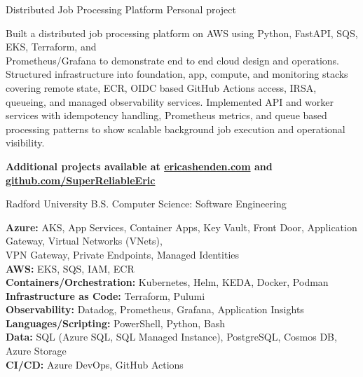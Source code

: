 \documentclass[a4paper]{ReadableCV}
\begin{document}
\medskip

{Distributed Job Processing Platform}
{Personal project}

\roleAchievements
{Built a distributed job processing platform on AWS using Python, FastAPI, SQS, EKS, Terraform, and\\ Prometheus/Grafana to demonstrate end to end cloud design and operations.}
{Structured infrastructure into foundation, app, compute, and monitoring stacks covering remote state, ECR, OIDC based GitHub Actions access, IRSA, queueing, and managed observability services.}
{Implemented API and worker services with idempotency handling, Prometheus metrics, and queue based processing patterns to show scalable background job execution and operational visibility.}
{}{}{}{}{}{}

\medskip
\begin{center}
\textbf{Additional projects available at \href{https://ericashenden.com}{ericashenden.com} and \href{https://github.com/SuperReliableEric}{github.com/SuperReliableEric}}
\end{center}
\medskip


{Radford University}
{B.S. Computer Science: Software Engineering}{}


{\small
\noindent\textbf{Azure:} AKS, App Services, Container Apps, Key Vault, Front Door, Application Gateway, Virtual Networks (VNets),\\
VPN Gateway, Private Endpoints, Managed Identities\\
\textbf{AWS:} EKS, SQS, IAM, ECR\\
\textbf{Containers/Orchestration:} Kubernetes, Helm, KEDA, Docker, Podman\\
\textbf{Infrastructure as Code:} Terraform, Pulumi\\
\textbf{Observability:} Datadog, Prometheus, Grafana, Application Insights\\
\textbf{Languages/Scripting:} PowerShell, Python, Bash\\
\textbf{Data:} SQL (Azure SQL, SQL Managed Instance), PostgreSQL, Cosmos DB, Azure Storage\\
\textbf{CI/CD:} Azure DevOps, GitHub Actions
}
\end{document}
